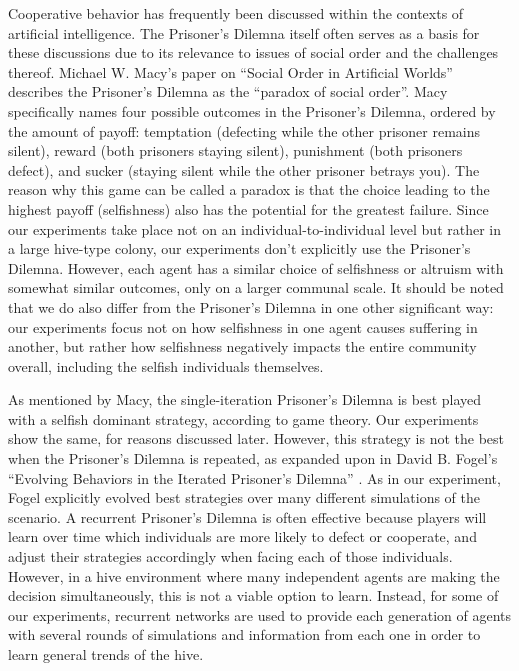 \documentclass[11pt]{article}
\begin{document}
		Cooperative behavior has frequently been discussed within the contexts of artificial intelligence. The Prisoner's Dilemna itself often serves as a basis for these discussions due to its relevance to issues of social order and the challenges thereof. Michael W. Macy's paper on ``Social Order in Artificial Worlds'' describes the Prisoner's Dilemna as the ``paradox of social order''. \cite{macy} Macy specifically names four possible outcomes in the Prisoner's Dilemna, ordered by the amount of payoff: temptation (defecting while the other prisoner remains silent), reward (both prisoners staying silent), punishment (both prisoners defect), and sucker (staying silent while the other prisoner betrays you). The reason why this game can be called a paradox is that the choice leading to the highest payoff (selfishness) also has the potential for the greatest failure. Since our experiments take place not on an individual-to-individual level but rather in a large hive-type colony, our experiments don't explicitly use the Prisoner's Dilemna. However, each agent has a similar choice of selfishness or altruism with somewhat similar outcomes, only on a larger communal scale. It should be noted that we do also differ from the Prisoner's Dilemna in one other significant way: our experiments focus not on how selfishness in one agent causes suffering in another, but rather how selfishness negatively impacts the entire community overall, including the selfish individuals themselves.

		As mentioned by Macy, the single-iteration Prisoner's Dilemna is best played with a selfish dominant strategy, according to game theory. Our experiments show the same, for reasons discussed later. However, this strategy is not the best when the Prisoner's Dilemna is repeated, as expanded upon in David B. Fogel's ``Evolving Behaviors in the Iterated Prisoner's Dilemna'' \cite{fogel}. As in our experiment, Fogel explicitly evolved best strategies over many different simulations of the scenario. A recurrent Prisoner's Dilemna is often effective because players will learn over time which individuals are more likely to defect or cooperate, and adjust their strategies accordingly when facing each of those individuals. However, in a hive environment where many independent agents are making the decision simultaneously, this is not a viable option to learn. Instead, for some of our experiments, recurrent networks are used to provide each generation of agents with several rounds of simulations and information from each one in order to learn general trends of the hive.
\end{document}
